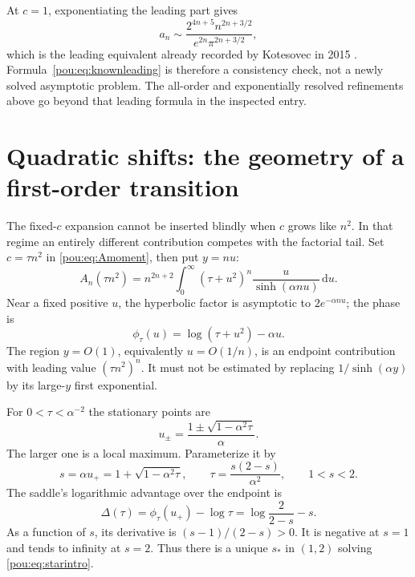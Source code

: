 \documentclass[11pt]{article}
\theoremstyle{definition}
\theoremstyle{remark}
\newcommand{\dd}{\,\mathrm d}
\begin{document}
At $c=1$, exponentiating the leading part gives
\begin{equation}\label{pou:eq:knownleading}
 a_n\sim\frac{2^{4n+5}n^{2n+3/2}}{e^{2n}\pi^{2n+3/2}},
\end{equation}
which is the leading equivalent already recorded by Kotesovec in 2015
\cite{oeis125054}.  Formula~\eqref{pou:eq:knownleading} is therefore a
consistency check, not a newly solved asymptotic problem.  The all-order
and exponentially resolved refinements above go beyond that leading
formula in the inspected entry.

\section{Quadratic shifts: the geometry of a first-order transition}
\label{pou:sec:geometry}

The fixed-$c$ expansion cannot be inserted blindly when $c$ grows like
$n^2$.  In that regime an entirely different contribution competes with
the factorial tail.  Set $c=\tau n^2$ in \eqref{pou:eq:Amoment}, then put $y=nu$:
\begin{equation}\label{pou:eq:scaledintegral}
 A_n(\tau n^2)=n^{2n+2}\int_0^\infty
  (\tau+u^2)^n\frac{u}{\sinh(\alpha nu)}\dd u.
\end{equation}
Near a fixed positive $u$, the hyperbolic factor is asymptotic to
$2e^{-\alpha nu}$; the phase is
\begin{equation}\label{pou:eq:phase}
 \phi_\tau(u)=\log(\tau+u^2)-\alpha u.
\end{equation}
The region $y=O(1)$, equivalently $u=O(1/n)$, is an endpoint contribution
with leading value $(\tau n^2)^n$.  It must not be estimated by replacing
$1/\sinh(\alpha y)$ by its large-$y$ first exponential.

For $0<\tau<\alpha^{-2}$ the stationary points are
\[
 u_\pm=\frac{1\pm\sqrt{1-\alpha^2\tau}}\alpha.
\]
The larger one is a local maximum.  Parameterize it by
\begin{equation}\label{pou:eq:sparam}
 s=\alpha u_+=1+\sqrt{1-\alpha^2\tau},\qquad
 \tau=\frac{s(2-s)}{\alpha^2},\qquad 1<s<2.
\end{equation}
The saddle's logarithmic advantage over the endpoint is
\begin{equation}\label{pou:eq:Delta}
 \Delta(\tau)=\phi_\tau(u_+)-\log\tau
 =\log\frac2{2-s}-s.
\end{equation}
As a function of $s$, its derivative is $(s-1)/(2-s)>0$.
It is negative at $s=1$ and tends to infinity at $s=2$.
Thus there is a unique $s_*$ in $(1,2)$ solving \eqref{pou:eq:starintro}.
\end{document}
